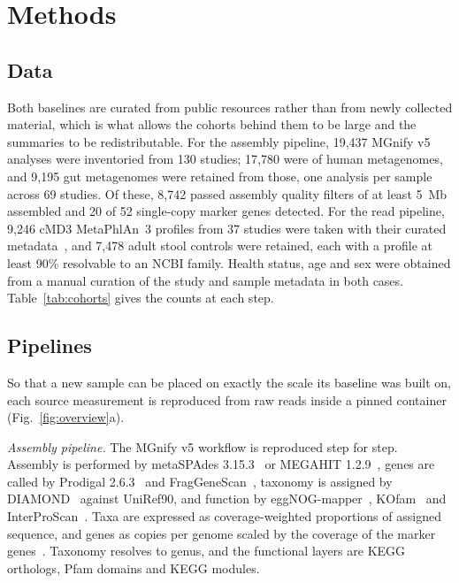 \documentclass[conference]{IEEEtran}
\begin{document}
\section{Methods}

\subsection{Data}

Both baselines are curated from public resources rather than from newly collected material, which is what allows the cohorts behind them to be large and the summaries to be redistributable. For the assembly pipeline, 19{,}437 MGnify v5 analyses were inventoried from 130 studies; 17{,}780 were of human metagenomes, and 9{,}195 gut metagenomes were retained from those, one analysis per sample across 69 studies. Of these, 8{,}742 passed assembly quality filters of at least 5~Mb assembled and 20 of 52 single-copy marker genes detected. For the read pipeline, 9{,}246 cMD3 MetaPhlAn~3 profiles from 37 studies were taken with their curated metadata~\cite{antonello2025}, and 7{,}478 adult stool controls were retained, each with a profile at least 90\% resolvable to an NCBI family. Health status, age and sex were obtained from a manual curation of the study and sample metadata in both cases. Table~\ref{tab:cohorts} gives the counts at each step.

\subsection{Pipelines}

So that a new sample can be placed on exactly the scale its baseline was built on, each source measurement is reproduced from raw reads inside a pinned container (Fig.~\ref{fig:overview}a).

\emph{Assembly pipeline.} The MGnify v5 workflow is reproduced step for step. Assembly is performed by metaSPAdes 3.15.3~\cite{nurk2017} or MEGAHIT 1.2.9~\cite{li2015}, genes are called by Prodigal 2.6.3~\cite{hyatt2010} and FragGeneScan~\cite{rho2010}, taxonomy is assigned by DIAMOND~\cite{buchfink2015} against UniRef90, and function by eggNOG-mapper~\cite{huerta2017}, KOfam~\cite{aramaki2020} and InterProScan~\cite{jones2014}. Taxa are expressed as coverage-weighted proportions of assigned sequence, and genes as copies per genome scaled by the coverage of the marker genes~\cite{nayfach2015}. Taxonomy resolves to genus, and the functional layers are KEGG orthologs, Pfam domains and KEGG modules.
\end{document}
